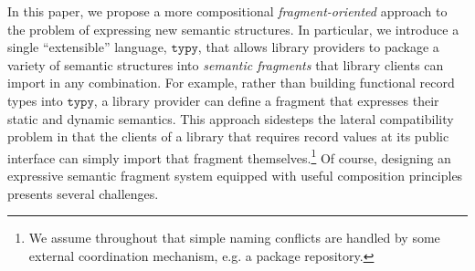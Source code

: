 \documentclass[preprint,10pt]{sigplanconf}
\newcommand{\typy}{\texttt{typy}}
\begin{document}
In this paper, we propose a more compositional \emph{fragment-oriented} approach to the problem of expressing new semantic structures. In particular, we introduce a 
single ``extensible'' language, $\typy$, that allows library providers to package a variety of semantic structures into  \emph{semantic fragments} that library clients can import in any combination. %
For example, rather than building functional record types into $\typy$, a library provider can define a fragment that expresses their static and dynamic semantics. This approach sidesteps the lateral compatibility problem in that the clients of a library that requires record values at its public interface can simply import that fragment themselves.\footnote{We assume throughout that simple naming conflicts are handled by some external coordination mechanism, e.g. a package repository.} %
Of course, designing an expressive {semantic fragment system} equipped with useful composition principles presents several challenges.


\end{document}
